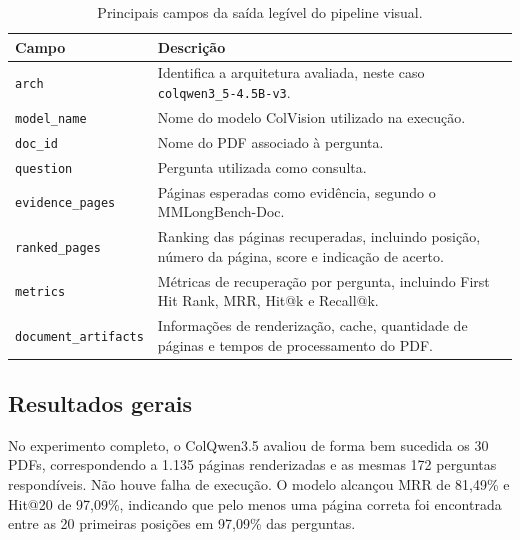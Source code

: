 \begin{table}[htbp]
\centering
\caption{Principais campos da saída legível do pipeline visual.}
\label{tab:saida-colvision-readable}
\small
\begin{tabular}{p{4.3cm}p{9.0cm}}
\toprule
\textbf{Campo} & \textbf{Descrição} \\
\midrule
\texttt{arch} & Identifica a arquitetura avaliada, neste caso \texttt{colqwen3\_5-4.5B-v3}. \\
\addlinespace
\texttt{model\_name} & Nome do modelo ColVision utilizado na execução. \\
\addlinespace
\texttt{doc\_id} & Nome do PDF associado à pergunta. \\
\addlinespace
\texttt{question} & Pergunta utilizada como consulta. \\
\addlinespace
\texttt{evidence\_pages} & Páginas esperadas como evidência, segundo o MMLongBench-Doc. \\
\addlinespace
\texttt{ranked\_pages} & Ranking das páginas recuperadas, incluindo posição, número da página, score e indicação de acerto. \\
\addlinespace
\texttt{metrics} & Métricas de recuperação por pergunta, incluindo First Hit Rank, MRR, Hit@k e Recall@k. \\
\addlinespace
\texttt{document\_artifacts} & Informações de renderização, cache, quantidade de páginas e tempos de processamento do PDF. \\
\bottomrule
\end{tabular}
\end{table}

\subsection{Resultados gerais}
\label{subsec:colvision-resultados-gerais}

No experimento completo, o ColQwen3.5 avaliou de forma bem sucedida os 30 PDFs, correspondendo a 1.135 páginas renderizadas e as mesmas 172 perguntas respondíveis. Não houve falha de execução. O modelo alcançou MRR de 81,49\% e Hit@20 de 97,09\%, indicando que pelo menos uma página correta foi encontrada entre as 20 primeiras posições em 97,09\% das perguntas.

